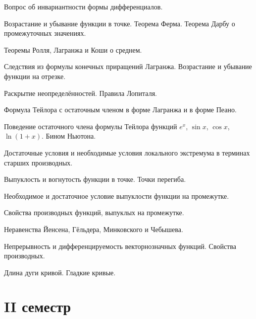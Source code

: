 \documentclass[a4paper]{article}
\begin{document}
\begin{nums}{-3}
Вопрос об инвариантности формы дифференциалов.
\item Возрастание и убывание функции в точке. Теорема Ферма. Теорема Дарбу о промежуточных
значениях.
\item Теоремы Ролля, Лагранжа и Коши о среднем.
\item Следствия из формулы конечных приращений Лагранжа. Возрастание и убывание функции на отрезке.
\item Раскрытие неопределённостей. Правила Лопиталя.
\item Формула Тейлора с остаточным членом в форме Лагранжа и в форме Пеано.
\item Поведение остаточного члена формулы Тейлора функций $e^x$, $\sin x$, $\cos x$, $\ln(1+x)$. Бином Ньютона.
\item Достаточные условия и необходимые условия локального экстремума в терминах старших производных.
\item Выпуклость и вогнутость функции в точке. Точки перегиба.
\item Необходимое и достаточное условие выпуклости функции на промежутке.
\item Свойства производных функций, выпуклых на промежутке.
\item Неравенства Йенсена, Гёльдера, Минковского и Чебышева.
\item Непрерывность и дифференцируемость векторнозначных функций. Свойства производных.
\item Длина дуги кривой. Гладкие кривые.
\end{nums}

\pagebreak

\section*{II семестр}
\end{document}
